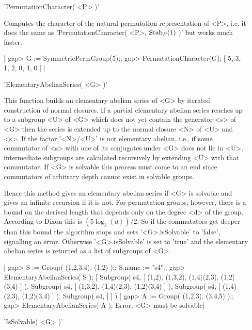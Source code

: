 \vspace{5mm}
'PermutationCharacter( <P> )'%

Computes the character of the natural permutation representation of  <P>,
i.e. it does the same as 'PermutationCharacter( <P>, ${\rm Stab}_P(1)$ )'
but works much faster.

|    gap> G := SymmetricPermGroup(5);;
    gap> PermutationCharacter(G);
    [ 5, 3, 1, 2, 0, 1, 0 ] |

\vspace{5mm}
'ElementaryAbelianSeries( <G> )'%

This  function  builds  an elementary  abelian series of <G>  by iterated
construction of normal closures. If a  partial elementary abelian  series
reaches  up  to  a  subgroup <U>  of <G> which  does not yet  contain the
generator <s> of <G> then the series is extended up to the normal closure
<N> of <U>  and <s>. If the factor  '<N>/<U>'  is not elementary abelian,
i.e., if some commutator of <s> with one of its conjugates under <G> does
not lie  in  <U>, intermediate  subgroups  are calculated  recursively by
extending <U> with that commutator. If <G> is solvable this process  must
come to  an  end  since commutators  of  arbitrary depth  cannot exist in
solvable groups.

Hence this method gives an elementary  abelian  series if <G> is solvable
and gives an infinite recursion  if  it is not.  For permutation  groups,
however, there is a  bound on the derived length that depends only on the
degree <d> of the group. According to Dixon this is $(5 \log_3(d))/2$. So
if  the commutators  get deeper  than this bound  the algorithm stops and
sets   '<G>.isSolvable'  to  'false',  signalling  an  error.   Otherwise
'<G>.isSolvable' is  set  to 'true' and the elementary abelian series  is
returned as a list of subgroups of <G>.

|    gap> S := Group( (1,2,3,4), (1,2) );; S.name := "s4";;
    gap> ElementaryAbelianSeries( S );
    [ Subgroup( s4, [ (1,2), (1,3,2), (1,4)(2,3), (1,2)(3,4) ] ),
      Subgroup( s4, [ (1,3,2), (1,4)(2,3), (1,2)(3,4) ] ),
      Subgroup( s4, [ (1,4)(2,3), (1,2)(3,4) ] ), Subgroup( s4, [  ] ) ]
    gap> A := Group( (1,2,3), (3,4,5) );;
    gap> ElementaryAbelianSeries( A );
    Error, <G> must be solvable|

\vspace{5mm}
'IsSolvable( <G> )'%

